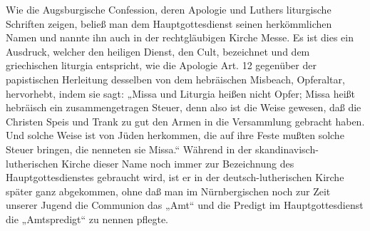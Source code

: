 Wie die Augsburgische Confession, deren Apologie und Luthers liturgische Schriften zeigen, beließ man dem Hauptgottesdienst seinen herkömmlichen Namen und nannte ihn auch in der rechtgläubigen Kirche Messe. Es ist dies ein Ausdruck, welcher den heiligen Dienst, den Cult, bezeichnet und dem
griechischen liturgia entspricht, wie die Apologie Art. 12 gegenüber der papistischen Herleitung desselben von dem hebräischen Misbeach, Opferaltar, hervorhebt, indem sie sagt: „Missa und Liturgia heißen nicht Opfer; Missa heißt hebräisch ein zusammengetragen Steuer, denn also ist die Weise gewesen, daß die Christen Speis und Trank zu gut den Armen in die Versammlung gebracht haben. Und solche Weise ist von Jüden herkommen, die auf ihre Feste mußten solche Steuer bringen, die nenneten sie Missa.“ Während in der skandinavisch-lutherischen Kirche dieser Name noch immer zur Bezeichnung des Hauptgottesdienstes gebraucht wird, ist er in der deutsch-lutherischen Kirche später ganz abgekommen, ohne daß man im Nürnbergischen noch zur Zeit unserer Jugend die Communion das „Amt“ und die Predigt im Hauptgottesdienst die „Amtspredigt“ zu nennen pflegte.

